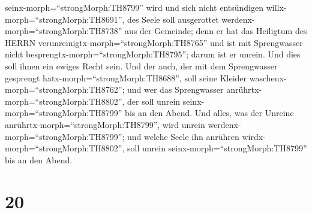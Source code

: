 seinx-morph=``strongMorph:TH8799'' wird und sich nicht entsündigen
willx-morph=``strongMorph:TH8691'', des Seele soll ausgerottet
werdenx-morph=``strongMorph:TH8738'' aus der Gemeinde; denn er hat das
Heiligtum des HERRN verunreinigtx-morph=``strongMorph:TH8765'' und ist
mit Sprengwasser nicht besprengtx-morph=``strongMorph:TH8795''; darum
ist er unrein.  Und dies soll ihnen ein ewiges Recht sein.
Und der auch, der mit dem Sprengwasser gesprengt
hatx-morph=``strongMorph:TH8688'', soll seine Kleider
waschenx-morph=``strongMorph:TH8762''; und wer das Sprengwasser
anrührtx-morph=``strongMorph:TH8802'', der soll unrein
seinx-morph=``strongMorph:TH8799'' bis an den Abend.  Und
alles, was der Unreine anrührtx-morph=``strongMorph:TH8799'', wird
unrein werdenx-morph=``strongMorph:TH8799''; und welche Seele ihn
anrühren wirdx-morph=``strongMorph:TH8802'', soll unrein
seinx-morph=``strongMorph:TH8799'' bis an den Abend.

\hypertarget{section-19}{%
\section{20}\label{section-19}}

